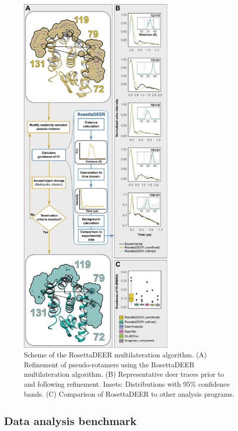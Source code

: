 \begin{figure}[h!]
\centering
\includegraphics[width=3in]{Figures/multilateration_main_scheme.pdf}
 \caption[Overall scheme of the RosettaDEER multilateration algorithm.]{Scheme of the RosettaDEER multilateration algorithm. (A) Refinement of pseudo-rotamers using the RosettaDEER multilateration algorithm. (B) Representative \gls{deer} traces prior to and following refinement. Insets: Distributions with 95\% confidence bands. (C) Comparison of RosettaDEER to other analysis programs.}
\label{fig:multilateration_main_scheme}
\end{figure}

\subsection{Data analysis benchmark}

